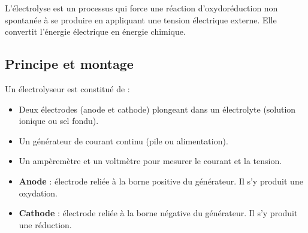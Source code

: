 \begin{definition}[Électrolyse]
L'électrolyse est un processus qui force une réaction d'oxydoréduction non spontanée à se produire en appliquant une tension électrique externe. Elle convertit l'énergie électrique en énergie chimique.
\end{definition}

\subsection{Principe et montage}

\begin{experience}
Un électrolyseur est constitué de :
\begin{itemize}
    \item Deux électrodes (anode et cathode) plongeant dans un électrolyte (solution ionique ou sel fondu).
    \item Un générateur de courant continu (pile ou alimentation).
    \item Un ampèremètre et un voltmètre pour mesurer le courant et la tension.
\end{itemize}
\end{experience}

\begin{propriete}
\begin{itemize}
    \item \textbf{Anode} : électrode reliée à la borne positive du générateur. Il s'y produit une oxydation.
    \item \textbf{Cathode} : électrode reliée à la borne négative du générateur. Il s'y produit une réduction.
\end{itemize}
\end{propriete}

\begin{illus}
\centering
{}
\end{illus}

